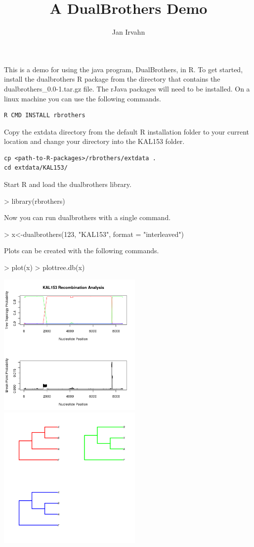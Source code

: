 \documentclass{article}
\begin{document}
\title{A DualBrothers Demo}
\author{Jan Irvahn}
\maketitle

This is a demo for using the java program, DualBrothers, in R.  To
get started, install the dualbrothers R package from the directory that contains the dualbrothers\_0.0-1.tar.gz file. The rJava packages will need to be installed. On a linux machine you can use the following commands.
\begin{verbatim}
R CMD INSTALL rbrothers
\end{verbatim}
Copy the extdata directory from the default R installation folder to your current location and change your directory into the KAL153 folder.
\begin{verbatim}
cp <path-to-R-packages>/rbrothers/extdata .
cd extdata/KAL153/					    
\end{verbatim}

Start R and load the dualbrothers library.

\begin{Schunk}
\begin{Sinput}
> library(rbrothers)
\end{Sinput}
\end{Schunk}

Now you can run dualbrothers with a single command.
\begin{Schunk}
\begin{Sinput}
> x<-dualbrothers(123, "KAL153", format = "interleaved")
\end{Sinput}
\end{Schunk}

Plots can be created with the following commands.
\begin{Schunk}
\begin{Sinput}
> plot(x)
> plottree.db(x)
\end{Sinput}
\end{Schunk}

\includegraphics[width=70mm]{KAL153p1.png}
\includegraphics[width=70mm]{KAL153p2.png}
\end{document}
